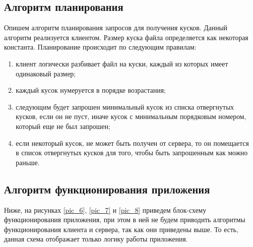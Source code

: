 \subsection{Алгоритм планирования}
Опишем алгоритм планирования запросов для получения кусков.
\newpar
Данный алгоритм реализуется клиентом. Размер куска файла определяется
как некоторая константа. Планирование происходит по следующим правилам:
\begin{enumerate}
    \item клиент логически разбивает файл на куски, каждый из которых
        имеет одинаковый размер;
    \item каждый кусок нумеруется в порядке возрастания;
    \item следующим будет запрошен минимальный кусок из списка
        отвергнутых кусков, если он не пуст, иначе кусок с минимальным
        порядковым номером, который еще не был запрошен;
    \item если некоторый кусок, не может быть получен от сервера, то он
        помещается в список отвергнутых кусков для того, чтобы быть
        запрошенным как можно раньше.
\end{enumerate}

\subsection{Алгоритм функционирования приложения}
Ниже, на рисунках \ref{pic_6}, \ref{pic_7} и \ref{pic_8} приведем блок-схему функционирования приложения,
при этом в ней не будем приводить алгоритмы функционирования клиента и
сервера, так как они приведены выше. То есть, данная схема отображает
только логику работы приложения.

